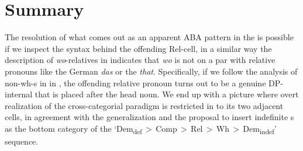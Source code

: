 \section{Summary}

The resolution of what comes out as an apparent ABA pattern  in the   is possible if we inspect the syntax behind the offending Rel-cell, in a similar way the description of \textit{wo}-relatives in  indicates that \textit{wo} is not on a par with relative pronouns like the German \textit{das} or the  \textit{that}. Specifically, if we follow the analysis of non-wh-s in  in \cite{Jenks-etall}, the offending relative pronoun turns out to be a genuine DP-internal  that is placed after the head noun. We end up with a picture where overt realization of the cross-categorial paradigm is restricted in  to its two adjacent cells, in agreement with the  generalization and the proposal to insert indefinite s as the bottom category of the `Dem\textsubscript{def}\,$>$\,Comp\,$>$\,Rel\,$>$\,Wh\,$>$\,Dem\textsubscript{indef}' sequence.




